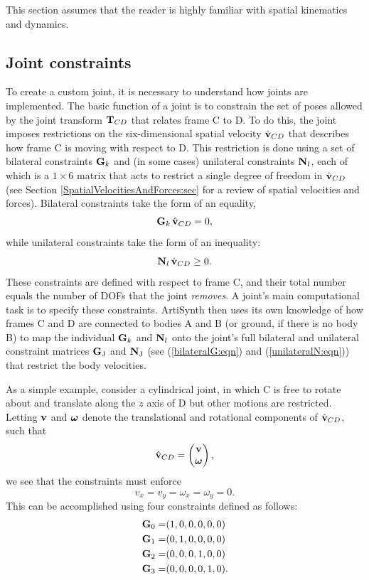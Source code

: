 This section assumes that the reader is highly familiar with spatial
kinematics and dynamics.

\subsection{Joint constraints}
\label{JointConstraints:sec}

To create a custom joint, it is necessary to understand how joints are
implemented. The basic function of a joint is to constrain the set of
poses allowed by the joint transform ${\bf T}_{CD}$ that relates frame C to
D. To do this, the joint imposes restrictions on the six-dimensional
spatial velocity $\hat{{\bf v}}_{CD}$ that describes how frame C is moving
with respect to D.  This restriction is done using a set of bilateral
constraints ${\bf G}_k$ and (in some cases) unilateral constraints ${\bf N}_l$,
each of which is a $1 \times 6$ matrix that acts to restrict a single
degree of freedom in $\hat{{\bf v}}_{CD}$ (see Section
\ref{SpatialVelocitiesAndForces:sec} for a review of
spatial velocities and forces). Bilateral constraints take the form of
an equality,
%
\begin{equation}
{\bf G}_k \, \hat{{\bf v}}_{CD} = 0,
\label{cbilateral:eqn}
\end{equation}
%
while unilateral constraints take the form of an inequality:
%
\begin{equation}
{\bf N}_l \, \hat{{\bf v}}_{CD} \ge 0.
\label{cunilateral:eqn}
\end{equation}
%
These constraints are defined with respect to frame C, and their total
number equals the number of DOFs that the joint {\it removes}. A
joint's main computational task is to specify these
constraints. ArtiSynth then uses its own knowledge of how frames C and
D are connected to bodies A and B (or ground, if there is no body B)
to map the individual ${\bf G}_k$ and ${\bf N}_l$ onto the joint's full
bilateral and unilateral constraint matrices ${\bf G}_\text{J}$ and ${\bf N}_\text{J}$ (see
(\ref{bilateralG:eqn}) and (\ref{unilateralN:eqn})) that restrict the
body velocities.

As a simple example, consider a cylindrical joint, in which C is free
to rotate about and translate along the $z$ axis of D but other
motions are restricted. Letting ${\bf v}$ and $\boldsymbol\omega$ denote the
translational and rotational components of $\hat{{\bf v}}_{CD}$, such that
%
\begin{equation*}
\hat{{\bf v}}_{CD} = \left(\begin{matrix} {\bf v} \\ \boldsymbol\omega \end{matrix}\right),
\end{equation*}
%
we see that the constraints must enforce
%
\begin{equation}
v_x = v_y = \omega_x = \omega_y = 0.
\end{equation}
%
This can be accomplished using four constraints defined as follows:
%
\begin{align*}
{\bf G}_0 = & (1, 0, 0, 0, 0, 0) \\
{\bf G}_1 = & (0, 1, 0, 0, 0, 0) \\
{\bf G}_2 = & (0, 0, 0, 1, 0, 0) \\
{\bf G}_3 = & (0, 0, 0, 0, 1, 0).
\end{align*}
%

